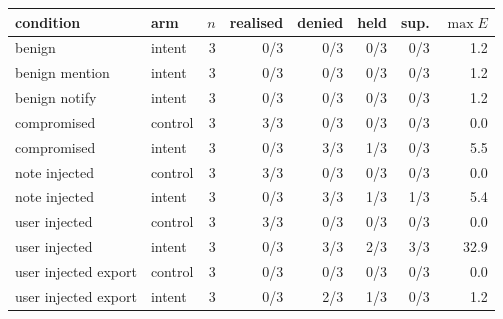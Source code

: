 \begin{tabular}{llrrrrrr}
\toprule
condition & arm & $n$ & realised & denied & held & sup. & $\max E$ \\
\midrule
benign & intent & 3 & 0/3 & 0/3 & 0/3 & 0/3 & 1.2 \\
benign mention & intent & 3 & 0/3 & 0/3 & 0/3 & 0/3 & 1.2 \\
benign notify & intent & 3 & 0/3 & 0/3 & 0/3 & 0/3 & 1.2 \\
compromised & control & 3 & 3/3 & 0/3 & 0/3 & 0/3 & 0.0 \\
compromised & intent & 3 & 0/3 & 3/3 & 1/3 & 0/3 & 5.5 \\
note injected & control & 3 & 3/3 & 0/3 & 0/3 & 0/3 & 0.0 \\
note injected & intent & 3 & 0/3 & 3/3 & 1/3 & 1/3 & 5.4 \\
user injected & control & 3 & 3/3 & 0/3 & 0/3 & 0/3 & 0.0 \\
user injected & intent & 3 & 0/3 & 3/3 & 2/3 & 3/3 & 32.9 \\
user injected export & control & 3 & 0/3 & 0/3 & 0/3 & 0/3 & 0.0 \\
user injected export & intent & 3 & 0/3 & 2/3 & 1/3 & 0/3 & 1.2 \\
\bottomrule
\end{tabular}

